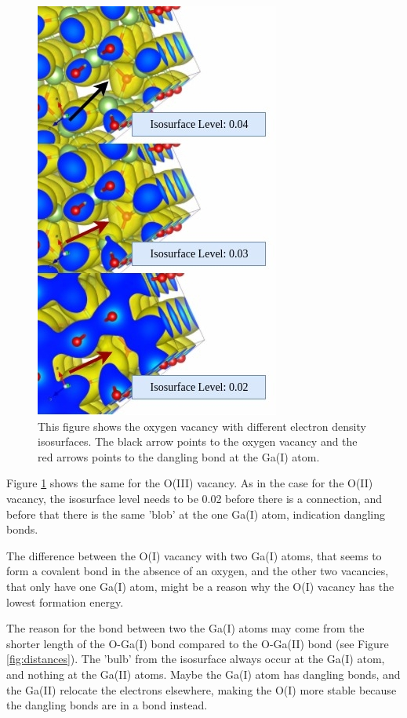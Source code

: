 \begin{figure}[H]
\includegraphics[width=0.7\linewidth]{../fig/isosurfaces/O_III/isosurface}\caption{This figure shows the oxygen vacancy with different electron density isosurfaces. The black arrow points to the oxygen vacancy and the red arrows points to the dangling bond at the Ga(I) atom.}\label{fig:isosurface_O_III}
\end{figure}

Figure \ref{fig:isosurface_O_III} shows the same for the O(III) vacancy. As in the case for the O(II) vacancy, the isosurface level needs to be 0.02 before there is a connection, and before that there is the same 'blob' at the one Ga(I) atom, indication dangling bonds.

The difference between the O(I) vacancy with two Ga(I) atoms, that seems to form a covalent bond in the absence of an oxygen, and the other two vacancies, that only have one Ga(I) atom, might be a reason why the O(I) vacancy has the lowest formation energy.

The reason for the bond between two the Ga(I) atoms may come from the shorter length of the O-Ga(I) bond compared to the O-Ga(II) bond (see Figure \ref{fig:distances}). The 'bulb' from the isosurface always occur at the Ga(I) atom, and nothing at the Ga(II) atoms. Maybe the Ga(I) atom has dangling bonds, and the Ga(II) relocate the electrons elsewhere, making the O(I) more stable because the dangling bonds are in a bond instead. 

